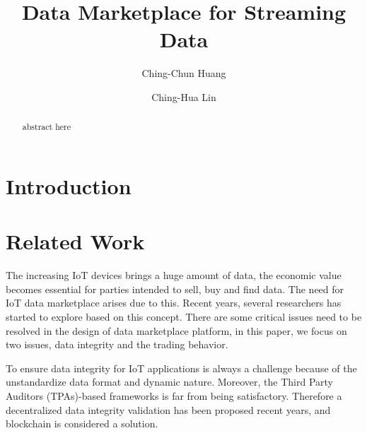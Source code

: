 \documentclass{svproc}
\begin{document}
\mainmatter              %
%
\title{Data Marketplace for Streaming Data}
%
%
\author{Ching-Chun Huang \and Ching-Hua Lin
}
%
%

\maketitle              %

\begin{abstract}
abstract here
\end{abstract}

\section{Introduction}

\section{Related Work}
The increasing IoT devices brings a huge amount of data, the economic value becomes essential for parties intended to sell, buy and find data. The need for IoT data marketplace arises due to this. Recent years, several researchers has started to explore based on this concept. There are some critical issues need to be resolved in the design of data marketplace platform, in this paper, we focus on two issues, data integrity and the trading behavior.

To ensure data integrity for IoT applications is always a challenge because of the unstandardize data format and dynamic nature. Moreover, the Third Party Auditors (TPAs)-based frameworks is far from being satisfactory. Therefore a decentralized data integrity validation has been proposed recent years, and blockchain is considered a solution. 
\end{document}
